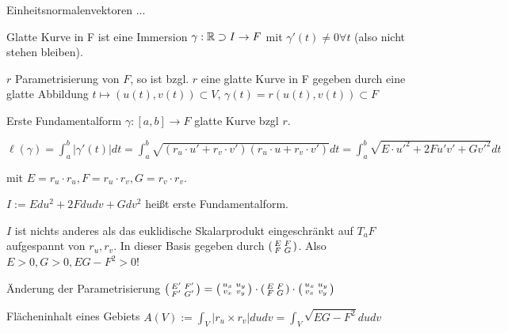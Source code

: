 \begin{defi}{Einheitsnormalenvektoren}
    ... %
\end{defi}

\begin{defi}{Glatte Kurve}
    in F ist eine Immersion
    $\gamma:\mathbb R\supset I\to F$ 
    mit $\gamma'(t) \neq 0 \forall t$ (also nicht stehen bleiben).
\end{defi}

\begin{bem}
    $r$ Parametrisierung von $F$, so ist bzgl. $r$ eine glatte Kurve in F gegeben durch
    eine glatte Abbildung $t\mapsto (u(t),v(t))\subset V$, 
    $\gamma(t) = r(u(t), v(t)) \subset F$
\end{bem}

\begin{defi}{Erste Fundamentalform}
    $\gamma:[a,b] \to F$ glatte Kurve bzgl $r$. 

    $\ell(\gamma) = \int_a^b |\gamma'(t)|dt = 
        \int_a^b \sqrt{(r_u\cdot u'+r_v\cdot v')(r_u\cdot u+r_v\cdot v')} dt =
        \int_a^b \sqrt{E\cdot u'^2 + 2Fu'v' + Gv'^2} dt$

    mit $E=r_u\cdot r_u, F=r_u\cdot r_v, G=r_v\cdot r_v$.
    
    $I:= Edu^2 + 2Fdudv + Gdv^2$ heißt erste Fundamentalform.
\end{defi}

\begin{bem}
    $I$ ist nichts anderes als das euklidische Skalarprodukt eingeschränkt auf
    $T_aF$ aufgespannt von $r_u, r_v$.
    In dieser Basis gegeben durch 
    $\begin{psmallmatrix}
        E & F \\ F & G \\
    \end{psmallmatrix}$.
    Also $E>0, G>0, EG-F^2>0$!
\end{bem}

\begin{bem}{Änderung der Parametrisierung}
    $\begin{psmallmatrix}
        E' & F' \\ F' & G' \\
    \end{psmallmatrix} = 
    \begin{psmallmatrix}
        u_x & u_y \\ v_x & v_y \\
    \end{psmallmatrix}
    \cdot
    \begin{psmallmatrix}
        E & F \\ F & G \\
    \end{psmallmatrix}
    \cdot
    \begin{psmallmatrix}
        u_x & u_y \\ v_x & v_y \\
    \end{psmallmatrix}$
\end{bem}

\begin{bem}{Flächeninhalt eines Gebiets}
    $A(V):=\int_V|r_u\times r_v|dudv = \int_V\sqrt{EG-F^2}dudv$
\end{bem}